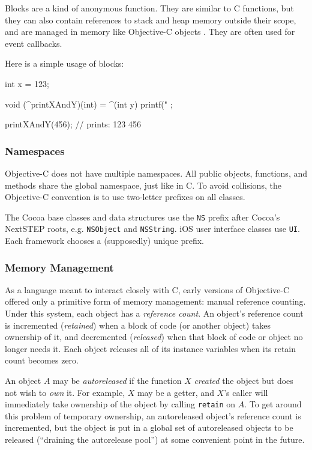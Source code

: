 Blocks are a kind of anonymous function. They are similar to C functions, but
they can also contain references to stack and heap memory outside their scope,
and are managed in memory like Objective-C objects \cite{objc:blocks}. They are often used for
event callbacks.

Here is a simple usage of blocks:

\begin{objc}
int x = 123;
 
void (^printXAndY)(int) = ^(int y) {
    printf("%
};

printXAndY(456); // prints: 123 456
\end{objc}

\subsubsection{Namespaces}
\label{sect:objc_namespaces}

Objective-C does not have multiple namespaces. All public objects, functions,
and methods share the global namespace, just like in C. To avoid collisions, the
Objective-C convention is to use two-letter prefixes on all classes.

The Cocoa base classes and data structures use the \texttt{NS} prefix after
Cocoa's NextSTEP roots, e.g. \texttt{NSObject} and \texttt{NSString}. iOS user
interface classes use \texttt{UI}. Each framework chooses a (supposedly) unique
prefix.

\subsubsection{Memory Management}
\label{sect:objc_memory}

As a language meant to interact closely with C, early versions of Objective-C
offered only a primitive form of memory management: manual reference counting.
Under this system, each object has a \emph{reference count}. An object's
reference count is incremented (\emph{retained}) when a block of code (or
another object) takes ownership of it, and decremented (\emph{released}) when
that block of code or object no longer needs it. Each object releases all of its
instance variables when its retain count becomes zero.

An object $A$ may be \emph{autoreleased} if the function $X$ \emph{created} the
object but does not wish to \emph{own} it. For example, $X$ may be a getter, and
$X$'s caller will immediately take ownership of the object by calling
\texttt{retain} on $A$. To get around this problem of temporary ownership, an
autoreleased object's reference count is incremented, but the object is put in a
global set of autoreleased objects to be released (``draining the autorelease
pool'') at some convenient point in the future.

